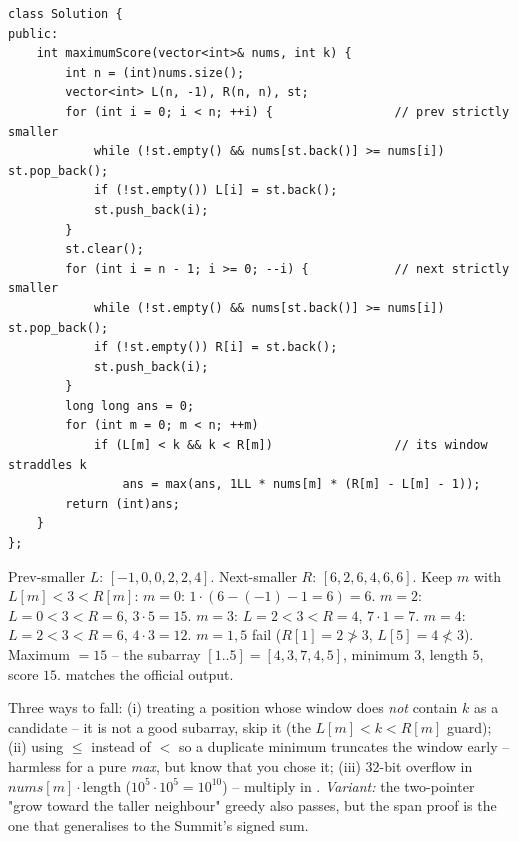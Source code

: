 \begin{lstlisting}[caption={Maximum Score of a Good Subarray -- spans from two stack passes (LeetCode 1793)}, label={lst:c26-goodsub-soln}]
class Solution {
public:
    int maximumScore(vector<int>& nums, int k) {
        int n = (int)nums.size();
        vector<int> L(n, -1), R(n, n), st;
        for (int i = 0; i < n; ++i) {                 // prev strictly smaller
            while (!st.empty() && nums[st.back()] >= nums[i]) st.pop_back();
            if (!st.empty()) L[i] = st.back();
            st.push_back(i);
        }
        st.clear();
        for (int i = n - 1; i >= 0; --i) {            // next strictly smaller
            while (!st.empty() && nums[st.back()] >= nums[i]) st.pop_back();
            if (!st.empty()) R[i] = st.back();
            st.push_back(i);
        }
        long long ans = 0;
        for (int m = 0; m < n; ++m)
            if (L[m] < k && k < R[m])                 // its window straddles k
                ans = max(ans, 1LL * nums[m] * (R[m] - L[m] - 1));
        return (int)ans;
    }
};
\end{lstlisting}

\begin{tracebox}[Official sample: \texttt{nums = [1,4,3,7,4,5]}, \texttt{k = 3}]
Prev-smaller $L$: $[-1,0,0,2,2,4]$. Next-smaller $R$: $[6,2,6,4,6,6]$. Keep $m$ with $L[m]<3<R[m]$:
$m=0$: $1\cdot(6-(-1)-1=6)=6$. $m=2$: $L=0<3<R=6$, $3\cdot5=15$. $m=3$: $L=2<3<R=4$, $7\cdot1=7$.
$m=4$: $L=2<3<R=6$, $4\cdot3=12$. $m=1,5$ fail ($R[1]=2\not>3$, $L[5]=4\not<3$). Maximum $=15$ --
the subarray $[1..5]=[4,3,7,4,5]$, minimum $3$, length $5$, score $15$. \checkmark matches the official
output.
\end{tracebox}


\begin{warningbox}
Three ways to fall: (i) treating a position whose window does \emph{not} contain $k$ as a candidate --
it is not a good subarray, skip it (the $L[m]<k<R[m]$ guard); (ii) using $\le$ instead of $<$ so a
duplicate minimum truncates the window early -- harmless for a pure \emph{max}, but know that you chose
it; (iii) $32$-bit overflow in $\mathit{nums}[m]\cdot\text{length}$ ($10^5 \cdot 10^5 = 10^{10}$) --
multiply in . \emph{Variant:} the two-pointer "grow toward the taller neighbour" greedy
also passes, but the span proof is the one that generalises to the Summit's signed sum.
\end{warningbox}

